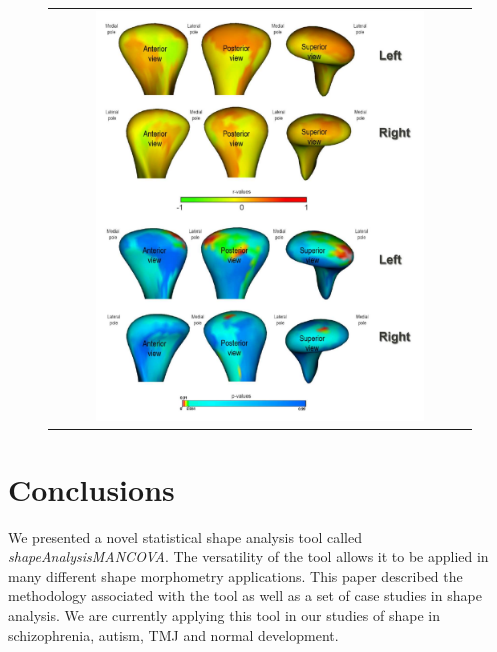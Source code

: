 \documentclass{InsightArticle}
\newcommand{\ProgramName}{\textit{shapeAnalysisMANCOVA}}
\begin{document}
\begin{figure}[htbp]
  \begin{center}
    \begin{tabular}[htbp]{c}
    \includegraphics[width=0.8\textwidth]{IJ_AnalysisScenario3_Correlations}
    \end{tabular}
    \label{fig:pearson}
  \end{center}
\end{figure}

\section{Conclusions}
\label{sec:conclusions}
We presented a novel statistical shape analysis tool called \ProgramName. The versatility of the tool allows it to be applied in many different shape morphometry applications. This paper described the methodology associated with the tool as well as a set of case studies in shape analysis. We are currently applying this tool in our studies of shape in schizophrenia, autism, TMJ and normal development. 
\end{document}
